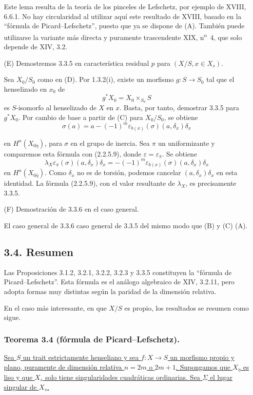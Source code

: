 Este lema resulta de la teoría de los pinceles de Lefschetz, por ejemplo
de XVIII, 6.6.1. No hay circularidad al utilizar aquí este resultado de
XVIII, basado en la ``fórmula de Picard--Lefschetz'', puesto que ya se
dispone de (A). También puede utilizarse la variante más directa y
puramente trascendente XIX, n\textsuperscript{o}~4, que solo depende de
XIV, 3.2.

\medskip
\noindent\textup{(E)}
Demostremos 3.3.5 en característica residual $p$ para
$(X/S,x\in X_s)$.

Sea $X_0/S_0$ como en (D). Por 1.3.2(i), existe un morfismo
$g:S\to S_0$ tal que el henselizado en $x_0$ de
\[
g^*X_0=X_0\times_{S_0}S
\]
es $S$-isomorfo al henselizado de $X$ en $x$. Basta, por tanto,
demostrar 3.3.5 para $g^*X_0$. Por cambio de base a partir de (C) para
$X_0/S_0$, se obtiene
\[
\sigma(a)=a-(-1)^m
\varepsilon_{b(x)}(\sigma)(a,\delta_x)\delta_x
\]

\pageoriginale

en $H^n(X_{0\bar\eta})$, para $\sigma$ en el grupo de inercia. Sea
$\pi$ un uniformizante y comparemos esta fórmula con (2.2.5.9), donde
$\varepsilon=\varepsilon_\pi$. Se obtiene
\[
\lambda_X\varepsilon_\pi(\sigma)(a,\delta_x)\delta_x
=-(-1)^m\varepsilon_{b(x)}(\sigma)(a,\delta_x)\delta_x
\]
en $H^n(X_{0\bar\eta})$. Como $\delta_x$ no es de torsión, podemos
cancelar $(a,\delta_x)\delta_x$ en esta identidad. La fórmula
(2.2.5.9), con el valor resultante de $\lambda_X$, es precisamente
3.3.5.

\medskip
\noindent\textup{(F) Demostración de 3.3.6 en el caso general.}

El caso general de 3.3.6  caso general de 3.3.5 del mismo
modo que (B) y (C)  (A).

\subsection*{3.4. Resumen}

Las Proposiciones 3.1.2, 3.2.1, 3.2.2, 3.2.3 y 3.3.5 constituyen la
``fórmula de Picard--Lefschetz''. Esta fórmula es el análogo algebraico
de XIV, 3.2.11, pero adopta formas muy distintas según la paridad de la
dimensión relativa.

En el caso más interesante, en que $X/S$ es propio, los resultados se
resumen como sigue.

\subsubsection*{Teorema 3.4 (fórmula de Picard--Lefschetz).}
\underline{Sea $S$ un trait estrictamente henseliano y sea
$f:X\to S$ un morfismo propio y plano, puramente de dimensión relativa
$n=2m$ o $2m+1$. Supongamos que $X_\eta$ es liso y que $X_s$ solo tiene
singularidades cuadráticas ordinarias. Sea $\Sigma$ el lugar singular
de $X_s$.}

